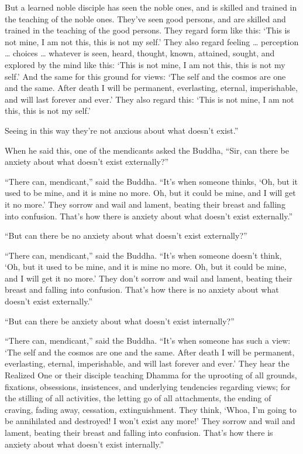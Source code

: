 \documentclass[12pt,openany]{book}%
\begin{document}
But a learned noble disciple has seen the noble ones, and is skilled and trained in the teaching of the noble ones. They’ve seen good persons, and are skilled and trained in the teaching of the good persons. They regard form like this: ‘This is not mine, I am not this, this is not my self.’ They also regard feeling … perception … choices … whatever is seen, heard, thought, known, attained, sought, and explored by the mind like this: ‘This is not mine, I am not this, this is not my self.’ And the same for this ground for views: ‘The self and the cosmos are one and the same. After death I will be permanent, everlasting, eternal, imperishable, and will last forever and ever.’ They also regard this: ‘This is not mine, I am not this, this is not my self.’ 

Seeing in this way they’re not anxious about what doesn’t exist.” 

When he said this, one of the mendicants asked the Buddha, “Sir, can there be anxiety about what doesn’t exist externally?” 

“There can, mendicant,” said the Buddha. “It’s when someone thinks, ‘Oh, but it used to be mine, and it is mine no more. Oh, but it could be mine, and I will get it no more.’ They sorrow and wail and lament, beating their breast and falling into confusion. That’s how there is anxiety about what doesn’t exist externally.” 

“But can there be no anxiety about what doesn’t exist externally?” 

“There can, mendicant,” said the Buddha. “It’s when someone doesn’t think, ‘Oh, but it used to be mine, and it is mine no more. Oh, but it could be mine, and I will get it no more.’ They don’t sorrow and wail and lament, beating their breast and falling into confusion. That’s how there is no anxiety about what doesn’t exist externally.” 

“But can there be anxiety about what doesn’t exist internally?” 

“There can, mendicant,” said the Buddha. “It’s when someone has such a view: ‘The self and the cosmos are one and the same. After death I will be permanent, everlasting, eternal, imperishable, and will last forever and ever.’ They hear the Realized One or their disciple teaching Dhamma for the uprooting of all grounds, fixations, obsessions, insistences, and underlying tendencies regarding views; for the stilling of all activities, the letting go of all attachments, the ending of craving, fading away, cessation, extinguishment. They think, ‘Whoa, I’m going to be annihilated and destroyed! I won’t exist any more!’ They sorrow and wail and lament, beating their breast and falling into confusion. That’s how there is anxiety about what doesn’t exist internally.” 
\end{document}
